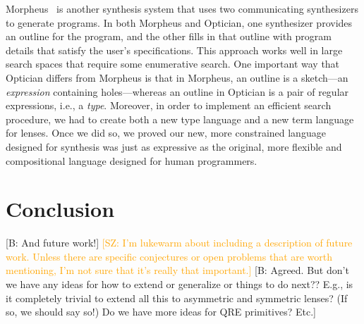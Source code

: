 \documentclass[acmsmall,review,anonymous]{acmart}
\newcommand{\FINISH}[3]{\ifdraft\textcolor{#1}{[#2: #3]}\fi}
\newcommand{\bcp}[1]{\FINISH{dkred}{B}{#1}}
\newcommand{\saz}[1]{\FINISH{orange}{SZ}{#1}}
\begin{document}
Morpheus~\cite{morpheus} is another synthesis system that uses two
communicating synthesizers to generate programs.  In both Morpheus and
Optician, one synthesizer provides an
outline for the program, and the other fills in that outline with program
details that satisfy the user's specifications.
This approach works well in large search spaces that require some enumerative
search.
One important way that Optician differs from Morpheus is that in
Morpheus, an outline is a sketch---an
\emph{expression}
containing holes---whereas
an outline in Optician is a pair of regular
expressions, i.e., a
\emph{type}.  Moreover, in order to implement an efficient
search procedure, we had to create both a new type language and a new
term language for lenses.  Once we did so, we proved our new, more
constrained language
designed for synthesis was just as expressive as the original, more
flexible and compositional language designed for human programmers.

\section{Conclusion}
\bcp{And future work!}  \saz{I'm lukewarm about including a description of
  future work.  Unless there are specific conjectures or open problems that
  are worth mentioning, I'm not sure that it's really that important.}
\bcp{Agreed. But don't we have any ideas for how to extend or generalize or
  things to do next??  E.g., is it completely trivial to extend all this to
  asymmetric and symmetric lenses?  (If so, we should say so!)  Do we have
  more ideas for QRE primitives?  Etc.}
\label{concl}



\end{document}

